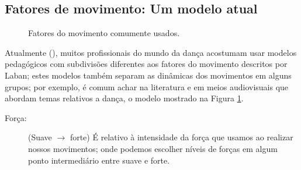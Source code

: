 \subsection{Fatores de movimento: Um modelo atual}
\label{subsec:fator:movimento:atual}
\begin{figure}
\centering
{} 
\caption{Fatores do movimento comumente usados.}
\label{fig:fatores:moviemnto:popular}
\end{figure}
Atualmente (\AnoLivro), 
muitos profissionais do mundo da dança acostumam usar modelos pedagógicos 
com subdivisões diferentes aos fatores do movimento descritos por Laban; 
estes modelos também separam as dinâmicas dos movimentos em alguns grupos;
por exemplo, é comum achar
na literatura \cite[pp. 30]{paine2014complete} \cite[pp. 181]{smith2014dance}
e em meios audiovisuais que abordam temas relativos a dança, 
o modelo mostrado na Figura \ref{fig:fatores:moviemnto:popular}.

\begin{description}
\item[Força:] (Suave $\rightarrow$ forte) 
É relativo à intensidade da força que usamos ao realizar nossos movimentos;
onde podemos escolher níveis de forças em algum ponto intermediário entre suave e forte. 
\end{description}

